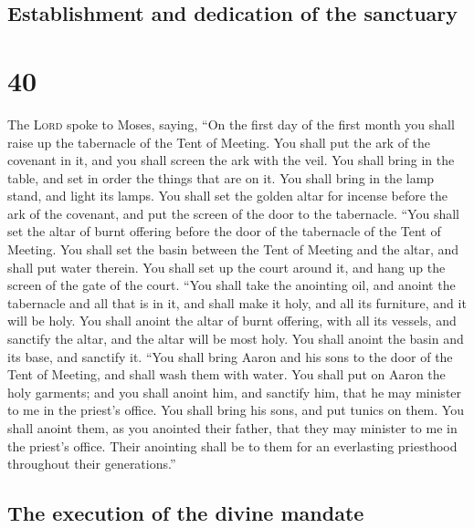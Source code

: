\hypertarget{establishment-and-dedication-of-the-sanctuary}{%
\subsection{Establishment and dedication of the
sanctuary}\label{establishment-and-dedication-of-the-sanctuary}}

\hypertarget{section-39}{%
\section{40}\label{section-39}}

 The \textsc{Lord} spoke to Moses, saying, 
``On the first day of the first month you shall raise up the tabernacle
of the Tent of Meeting.  You shall put the ark of the
covenant in it, and you shall screen the ark with the veil.
 You shall bring in the table, and set in order the things
that are on it. You shall bring in the lamp stand, and light its lamps.
 You shall set the golden altar for incense before the ark
of the covenant, and put the screen of the door to the tabernacle.
 ``You shall set the altar of burnt offering before the
door of the tabernacle of the Tent of Meeting.  You shall
set the basin between the Tent of Meeting and the altar, and shall put
water therein.  You shall set up the court around it, and
hang up the screen of the gate of the court.  ``You shall
take the anointing oil, and anoint the tabernacle and all that is in it,
and shall make it holy, and all its furniture, and it will be holy.
 You shall anoint the altar of burnt offering, with all
its vessels, and sanctify the altar, and the altar will be most holy.
 You shall anoint the basin and its base, and sanctify
it.  ``You shall bring Aaron and his sons to the door of
the Tent of Meeting, and shall wash them with water.  You
shall put on Aaron the holy garments; and you shall anoint him, and
sanctify him, that he may minister to me in the priest's office.
 You shall bring his sons, and put tunics on them.
 You shall anoint them, as you anointed their father,
that they may minister to me in the priest's office. Their anointing
shall be to them for an everlasting priesthood throughout their
generations.''

\hypertarget{the-execution-of-the-divine-mandate}{%
\subsection{The execution of the divine
mandate}\label{the-execution-of-the-divine-mandate}}

